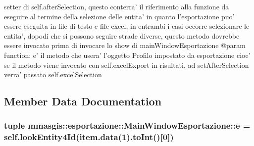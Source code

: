 \label{classmmasgis_1_1esportazione_1_1MainWindowEsportazione_a95e7166866855cfef994779d7f9492a7}
\begin{DoxyVerb}
setter di self.afterSelection, questo conterra' il riferimento alla funzione da eseguire al termine della selezione delle entita'
in quanto l'esportazione puo' essere eseguita in file di testo e file excel, in entrambi i casi occorre selezionare le entita', dopodi che si 
possono seguire strade diverse, questo metodo dovrebbe essere invocato prima di invocare lo show di mainWindowEsportazione
@param function: e' il metodo che usera' l'oggetto Profilo impostato da esportazione
cioe' se il metodo viene invocato con self.excelExport in risultati, ad setAfterSelection verra' passato self.excelSelection  
\end{DoxyVerb}
 

\subsection{Member Data Documentation}
\hypertarget{classmmasgis_1_1esportazione_1_1MainWindowEsportazione_af64a8c9197b5b01af6653a51a313010c}{
\subsubsection[{afterSelection}]{}}
\label{classmmasgis_1_1esportazione_1_1MainWindowEsportazione_af64a8c9197b5b01af6653a51a313010c}
\hypertarget{classmmasgis_1_1esportazione_1_1MainWindowEsportazione_aafce641ba590d092e8e0d9ce68ff499a}{
\subsubsection[{db}]{}}
\label{classmmasgis_1_1esportazione_1_1MainWindowEsportazione_aafce641ba590d092e8e0d9ce68ff499a}
\hypertarget{classmmasgis_1_1esportazione_1_1MainWindowEsportazione_a46fa8fe2e7557ba3143877a865c289d9}{
\subsubsection[{e}]{\setlength{\rightskip}{0pt plus 5cm}tuple {\bf mmasgis::esportazione::MainWindowEsportazione::e} = self.lookEntity4Id(item.data(1).toInt()\mbox{[}0\mbox{]})}}
